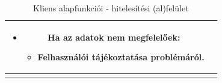 \documentclass[twoside, a4paper, 12pt]{book}
\begin{document}
\begin{longtable}[c]{|c|p{14cm}|}
\begin{itemize}
		\item Ha az adatok nem megfelelőek:
		\begin{itemize}
			\item Felhasználói tájékoztatása problémáról.
		\end{itemize}
	\end{itemize}
	\\
	\hline
	
	\caption{Kliens alapfunkciói - hitelesítési (al)felület}
	\label{userStories:client:authentication}\\
\end{longtable}

\end{document}
